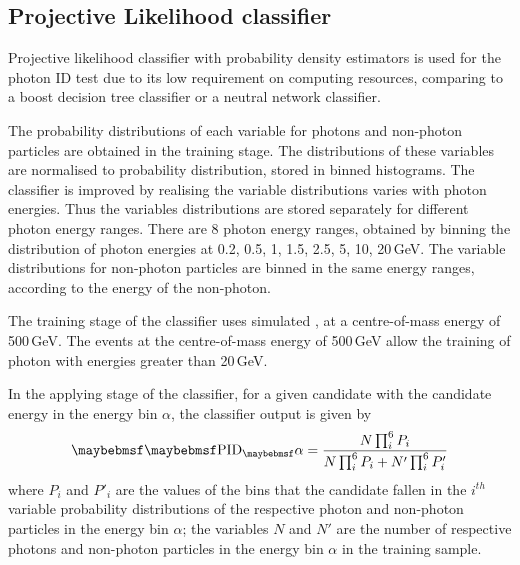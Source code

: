 
\subsection{Projective Likelihood classifier}


Projective likelihood classifier  with probability density estimators is used  for the photon ID test due to its  low requirement on computing resources, comparing to a boost decision tree classifier or a neutral network classifier.

The probability distributions of each variable for photons and non-photon particles are obtained in the training stage. The distributions of these variables are normalised to probability distribution, stored in binned histograms. The classifier is improved by realising the variable distributions varies with photon energies. Thus the variables distributions are stored separately for different photon energy ranges. There are 8 photon energy ranges, obtained by binning the distribution of photon energies at 0.2, 0.5, 1, 1.5, 2.5, 5, 10, 20\,GeV. The variable distributions for non-photon particles are binned in the same energy ranges, according to the energy of the non-photon.

The training stage of the classifier uses simulated  \eeZuds, at a centre-of-mass energy of 500\,GeV. The events at the centre-of-mass energy of 500\,GeV allow the training of photon with energies greater than 20\,GeV.


In the applying stage of the classifier, for a given candidate with the candidate energy in the  energy bin $\alpha$, the classifier output is given by
\begin{equation}
\uprightMath{PID_\alpha} = \frac{N \prod_{i}^6{P_{i}}}{N \prod_{i}^6{P_{i}} + N' \prod_{i}^6{P'_{i}}}
\end{equation}
where $P_{i}$ and $P'_{i}$ are the values of the bins that the candidate fallen in the $i^{th}$ variable probability distributions  of the  respective photon and non-photon particles in the energy bin $\alpha$; the variables $N$ and $N'$ are the number of respective photons and non-photon particles in the energy bin $\alpha$ in the training sample.


